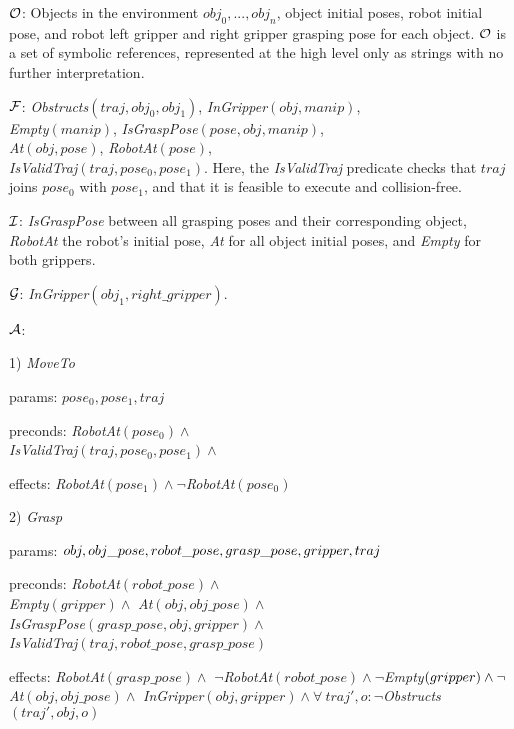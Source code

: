 \begin{tightlist}
\item[$\mathcal{O}$:] Objects in the environment $obj_{0}, ..., obj_{n}$, object initial poses,
robot initial pose, and robot left gripper and right gripper grasping pose
for each object. $\mathcal{O}$ is a set of symbolic references, represented at the high
level only as strings with no further interpretation.

\item[$\mathcal{F}$:] \emph{Obstructs}$(traj, obj_{0}, obj_{1})$, \emph{InGripper}$(obj, manip)$,\\\emph{Empty}$(manip)$,
\emph{IsGraspPose}$(pose, obj, manip)$,\\\emph{At}$(obj, pose)$, \emph{RobotAt}$(pose)$,\\
\emph{IsValidTraj}$(traj, pose_{0}, pose_{1})$. Here, the \emph{IsValidTraj} predicate checks that $traj$
joins $pose_{0}$ with $pose_{1}$, and that it is feasible to execute and
collision-free.

\item[$\mathcal{I}$:] \emph{IsGraspPose} between all grasping poses and their corresponding object,
\emph{RobotAt} the robot's initial pose, \emph{At} for all object initial poses, and
\emph{Empty} for both grippers.

\item[$\mathcal{G}$:] \emph{InGripper}$(obj_{1}, right\_gripper)$.

\item[$\mathcal{A}$:]
\begin{tightlist}
\item[1)] \emph{MoveTo}
  \begin{tightlist}
  \item[params:]$pose_{0}, pose_{1}, traj$
  \item[preconds:]\emph{RobotAt}$(pose_{0}) \wedge$\\ \emph{IsValidTraj}$(traj, pose_{0}, pose_{1}) \wedge$
  \item[effects:]\emph{RobotAt}$(pose_{1}) \wedge \lnot$\emph{RobotAt}$(pose_{0})$
  \end{tightlist}
\item[2)] \emph{Grasp}
  \begin{tightlist}
  \item[params:]$obj, obj\_pose, robot\_pose,\\grasp\_pose, gripper, traj$
  \item[preconds:]\emph{RobotAt}$(robot\_pose) \wedge$\\ \emph{Empty}$(gripper) \wedge$
\emph{At}$(obj, obj\_pose) \wedge$\\ \emph{IsGraspPose}$(grasp\_pose, obj, gripper) \wedge$\\ \emph{IsValidTraj}$(traj, robot\_pose, grasp\_pose)$
  \item[effects:]\emph{RobotAt}$(grasp\_pose) \wedge$ $\lnot$\emph{RobotAt}$(robot\_pose) \wedge \lnot$\emph{Empty}$(gripper) \wedge\\
\lnot$\emph{At}$(obj, obj\_pose) \wedge$ \emph{InGripper}$(obj, gripper) \wedge \forall\ traj', o: \lnot$\emph{Obstructs}$(traj', obj, o)$
  \end{tightlist}
\end{tightlist}
\end{tightlist}

